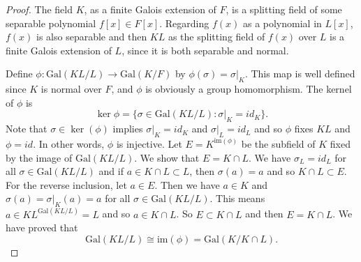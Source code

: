 \documentclass[12pt]{report}
\theoremstyle{definition}
\newcommand{\gal}{\text{Gal}}
\newcommand{\im}{\text{im}}
\begin{document}
\begin{proof}
	The field $K$, as a finite Galois extension of $F$, is a splitting field of some separable polynomial $f[x]\in F[x]$. Regarding $f(x)$ as a polynomial in $L[x]$, $f(x)$ is also separable and then $KL$ as the splitting field of $f(x)$ over $L$ is a finite Galois extension of $L$, since it is both separable and normal.

	Define $\phi: \gal(KL/L)\to \gal(K/F)$ by $\phi(\sigma)=\sigma|_K$. This map is well defined since $K$ is normal over $F$, and $\phi$ is obviously a group homomorphism. The kernel of $\phi$ is $$\ker \phi = \{\sigma\in \gal(KL/L): \sigma|_K=id_K\}.$$
	Note that $\sigma\in \ker(\phi)$ implies $\sigma|_K=id_K$ and $\sigma|_L=id_L$ and so $\phi$ fixes $KL$ and $\phi=id$. In other words, $\phi$ is injective. Let $E=K^{\im(\phi)}$ be the subfield of $K$ fixed by the image of $\gal(KL/L)$. We show that $E=K\cap L$. We have $\sigma_L=id_L$ for all $\sigma\in \gal(KL/L)$ and if $a\in K\cap L \subset L$, then $\sigma(a)=a$ and so $K\cap L\subset E$. For the reverse inclusion, let $a\in E$. Then we have $a\in K$ and $\sigma(a)=\sigma|_K(a)=a$ for all $\sigma\in \gal(KL/L)$. This means $a\in KL^{\gal(KL/L)}=L$ and so $a\in K\cap L$. So $E\subset K\cap L$ and then $E=K\cap L$. We have proved that \[\gal(KL/L)\cong \im(\phi) =\gal(K/K\cap L).\]
\end{proof}
\end{document}
